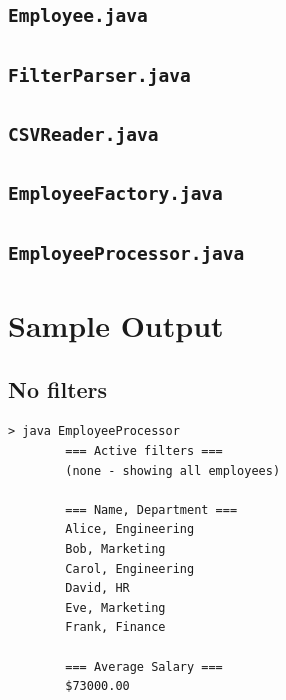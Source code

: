 \documentclass[12pt, a4paper]{article}
\begin{document}
	\subsection{\texttt{Employee.java}}
	
	
	
	\subsection{\texttt{FilterParser.java}}
	
	
	
	\subsection{\texttt{CSVReader.java}}
	
	
	
	\subsection{\texttt{EmployeeFactory.java}}
	
	
	
	\subsection{\texttt{EmployeeProcessor.java}}
	
	
	
	\section{Sample Output}
	
	\subsection{No filters}
	
	\begin{lstlisting}[style=output]
		> java EmployeeProcessor
		=== Active filters ===
		(none - showing all employees)
		
		=== Name, Department ===
		Alice, Engineering
		Bob, Marketing
		Carol, Engineering
		David, HR
		Eve, Marketing
		Frank, Finance
		
		=== Average Salary ===
		$73000.00
	\end{lstlisting}
	
\end{document}
